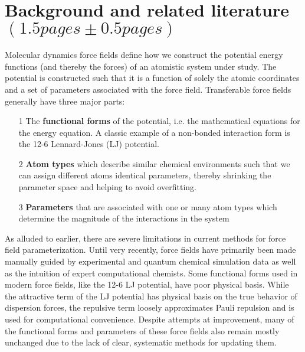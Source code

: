 \documentclass[rmp,nofootinbib,superscriptaddress,12pt,tightenlines,notitlepage]{revtex4-1}
\begin{document}
\section{Background and related literature $\left(1.5 pages \pm 0.5 pages\right)$}
Molecular dynamics force fields define how we construct the potential energy functions (and thereby the forces) of an atomistic system under study. The potential is constructed such that it is a function of solely the atomic coordinates and a set of parameters associated with the force field. Transferable force fields generally have three major parts: 
  \begin{itemize}
   \item [1] The \textbf{functional forms} of the potential, i.e. the mathematical equations for the energy equation. A classic example of a non-bonded interaction form is the 12-6 Lennard-Jones (LJ) potential.  
   \item [2] \textbf{Atom types} which describe similar chemical environments such that we can assign different atoms identical parameters, thereby shrinking the parameter space and helping to avoid overfitting.
   \item [3] \textbf{Parameters} that are associated with one or many atom types which determine the magnitude of the interactions in the system 
  \end{itemize}


As alluded to earlier, there are severe limitations in current methods for force field parameterization. Until very recently, force fields have primarily been made manually guided by experimental and quantum chemical simulation data as well as the intuition of expert computational chemists.\cite{charmm1,charmm2,mm2,mmff,amber} Some functional forms used in modern force fields, like the 12-6 LJ potential, have poor physical basis. While the attractive term of the LJ potential has physical basis on the true behavior of dispersion forces, the repulsive term loosely approximates Pauli repulsion and is used for computational convenience. Despite attempts at improvement, many of the functional forms and parameters of these force fields also remain mostly unchanged due to the lack of clear, systematic methods for updating them.\cite{unchanged}
\end{document}
